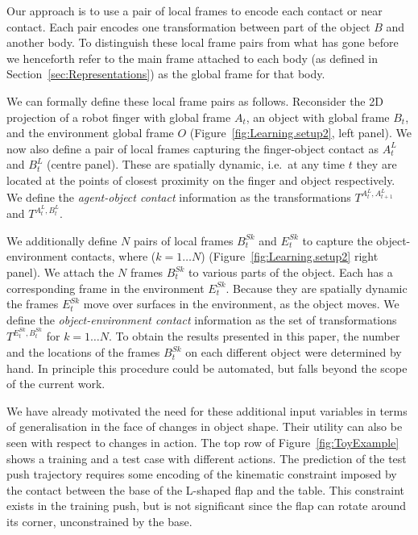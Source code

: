 Our approach is to use a pair of local frames to encode each contact or near contact. Each pair encodes one transformation between part of the object $B$ and another body.  To distinguish these local frame pairs from what has gone before we henceforth refer to the main frame attached to each body (as defined in Section~\ref{sec:Representations}) as the global frame for that body. 

We can formally define these local frame pairs as follows. Reconsider
the 2D projection of a robot finger with global frame $A_{t}$, an
object with global frame $B_{t}$, and the environment global frame $O$
(Figure~\ref{fig:Learning.setup2}, left panel). We now also define a pair of local frames
capturing the finger-object contact as $A^{L}_{t}$ and
$B^{L}_{t}$ (centre panel). These are spatially dynamic, i.e.\ at any time $t$ they
are located at the points of closest proximity on the finger and
object respectively.  We define the \textit{agent-object contact}
information as the transformations $T^{A^{L}_{t}, A^{L}_{t+1}}$ and
$T^{A^{L}_t, B^{L}_t}$.

We additionally define $N$ pairs of local frames $B^{Sk}_t$ and $E^{Sk}_t$ to
capture the object-environment contacts, where ($k=1 \ldots N$) (Figure~\ref{fig:Learning.setup2} right panel). We attach the $N$ frames $B^{Sk}_t$
to various parts of the object. Each has a corresponding frame in the
environment $E^{Sk}_t$.  Because they are spatially dynamic the
frames $E^{Sk}_t$ move over surfaces in the environment, as the
object moves. We define the \textit{object-environment contact}
information as the set of transformations $T^{E^{Sk}_t,B^{Sk}_t}$ for $k=1
\ldots N$. To obtain the results presented in this paper, the number and the
locations of the frames $B^{Sk}_t$ on each different object were
determined by hand. In principle this procedure could be automated,
but falls beyond the scope of the current work.

We have already motivated the need for these additional input
variables in terms of generalisation in the face of changes in object
shape. Their utility can also be seen with respect to changes in
action. The top row of Figure~\ref{fig:ToyExample} shows a training
and a test case with different actions. The prediction of the test
push trajectory requires some encoding of the kinematic constraint
imposed by the contact between the base of the L-shaped flap and the
table. This constraint exists in the training push, but is not
significant since the flap can rotate around its corner, unconstrained
by the base.

